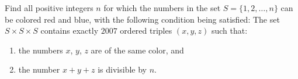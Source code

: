 Find all positive integers $ n$ for which the numbers in the set $ S = \{1,2, \ldots,n \}$ can be colored red and blue, with the following condition being satisfied: The set $ S \times S \times S$ contains exactly $ 2007$ ordered triples $ \left(x, y, z\right)$ such that:

\begin{enumerate}[label = (\alph*)]
	\item the numbers $ x$,  $ y$,  $ z$ are of the same color, and
	\item the number $ x + y + z$ is divisible by $ n$.
\end{enumerate}
